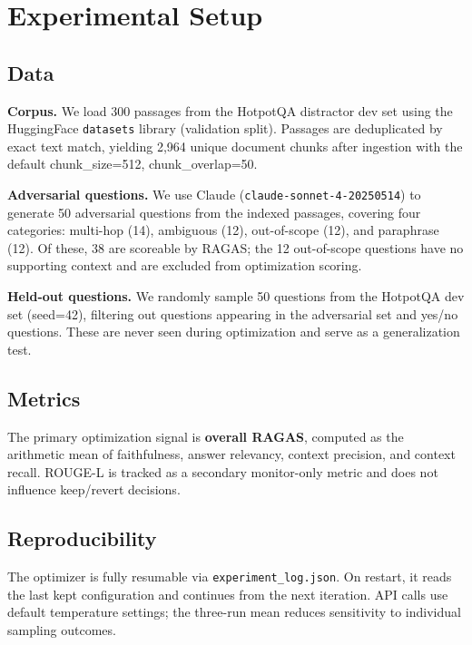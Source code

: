 \documentclass[11pt,a4paper]{article}
\begin{document}
\section{Experimental Setup}

\subsection{Data}

\textbf{Corpus.} We load 300 passages from the HotpotQA distractor dev set
using the HuggingFace \texttt{datasets} library (validation split). Passages
are deduplicated by exact text match, yielding 2,964 unique document chunks
after ingestion with the default chunk\_size=512, chunk\_overlap=50.

\textbf{Adversarial questions.} We use Claude (\texttt{claude-sonnet-4-20250514})
to generate 50 adversarial questions from the indexed passages, covering four
categories: multi-hop (14), ambiguous (12), out-of-scope (12), and paraphrase
(12). Of these, 38 are scoreable by RAGAS; the 12 out-of-scope questions have
no supporting context and are excluded from optimization scoring.

\textbf{Held-out questions.} We randomly sample 50 questions from the HotpotQA
dev set (seed=42), filtering out questions appearing in the adversarial set and
yes/no questions. These are never seen during optimization and serve as a
generalization test.

\subsection{Metrics}

The primary optimization signal is \textbf{overall RAGAS}, computed as the
arithmetic mean of faithfulness, answer relevancy, context precision, and
context recall. ROUGE-L is tracked as a secondary monitor-only metric and does
not influence keep/revert decisions.

\subsection{Reproducibility}

The optimizer is fully resumable via \texttt{experiment\_log.json}. On restart,
it reads the last kept configuration and continues from the next iteration.
API calls use default temperature settings; the three-run mean reduces
sensitivity to individual sampling outcomes.
\end{document}
